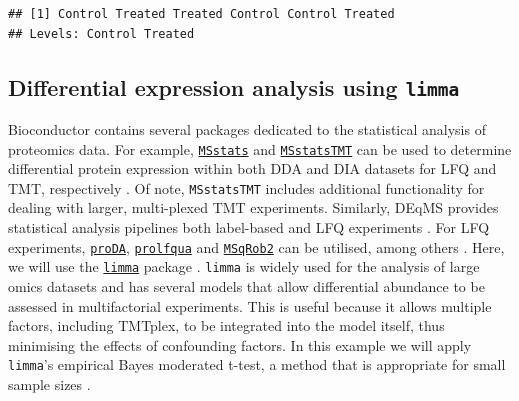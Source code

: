 \documentclass[9pt,a4paper,]{extarticle}
\newenvironment{Shaded}{\begin{snugshade}}{\end{snugshade}}
\newcommand{\AttributeTok}[1]{\textcolor[rgb]{0.13,0.29,0.53}{#1}}
\newcommand{\FunctionTok}[1]{\textcolor[rgb]{0.13,0.29,0.53}{\textbf{#1}}}
\newcommand{\NormalTok}[1]{#1}
\newcommand{\OtherTok}[1]{\textcolor[rgb]{0.56,0.35,0.01}{#1}}
\newcommand{\SpecialCharTok}[1]{\textcolor[rgb]{0.81,0.36,0.00}{\textbf{#1}}}
\newcommand{\StringTok}[1]{\textcolor[rgb]{0.31,0.60,0.02}{#1}}
\begin{document}
\begin{verbatim}
## [1] Control Treated Treated Control Control Treated
## Levels: Control Treated
\end{verbatim}

\begin{Shaded}
\end{Shaded}

\subsection{\texorpdfstring{Differential expression analysis using \texttt{limma}}{Differential expression analysis using limma}}\label{differential-expression-analysis-using-limma}

Bioconductor contains several packages dedicated to the statistical analysis of
proteomics data. For example, \href{https://bioconductor.org/packages/3.15/bioc/html/MSstats.html}{\texttt{MSstats}}
and \href{https://bioconductor.org/packages/3.15/bioc/html/MSstatsTMT.html}{\texttt{MSstatsTMT}}
can be used to determine differential protein expression within both DDA and DIA
datasets for LFQ and TMT, respectively \citep{Choi2014, Huang2020}. Of note,
\texttt{MSstatsTMT} includes additional functionality for dealing with larger,
multi-plexed TMT experiments. Similarly, DEqMS provides statistical analysis
pipelines both label-based and LFQ experiments \citep{Zhu2020}. For LFQ experiments,
\href{https://bioconductor.org/packages/release/bioc/html/proDA.html}{\texttt{proDA}},
\href{https://rdrr.io/github/wolski/prolfqua/}{\texttt{prolfqua}} and
\href{https://www.bioconductor.org/packages/release/bioc/html/msqrob2.html}{\texttt{MSqRob2}}
can be utilised, among others \citep{Goeminne2020, Wolski2023}. Here, we will use the
\href{https://bioconductor.org/packages/release/bioc/html/limma.html}{\texttt{limma}}
package \citep{Ritchie2015}. \texttt{limma} is widely used for the analysis of large omics
datasets and has several models that allow differential abundance to be assessed
in multifactorial experiments. This is useful because it allows multiple factors,
including TMTplex, to be integrated into the model itself, thus minimising the
effects of confounding factors. In this example we will apply \texttt{limma}'s
empirical Bayes moderated t-test, a method that is appropriate for small sample
sizes \citep{Smyth2004}.
\end{document}
